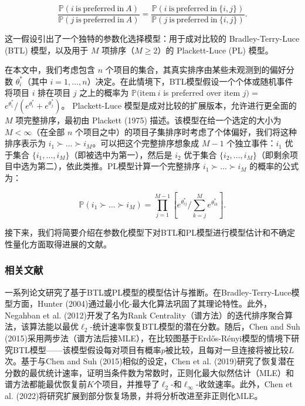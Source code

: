 $$
\frac{\mathbb{P}(i\mathrm{~is~preferred~in~}A)}{\mathbb{P}(j\mathrm{~is~preferred~in~}A)} = \frac{\mathbb{P}(i\mathrm{~is~preferred~in~}\{i,j\})}{\mathbb{P}(j\mathrm{~is~preferred~in~}\{i,j\})}.
$$

这一假设引出了一个独特的参数化选择模型：用于成对比较的 Bradley-Terry-Luce (BTL) 模型，以及用于 $M$ 项排序（$M\geq 2$）的 Plackett-Luce (PL) 模型。

在本文中，我们考虑包含 $n$ 个项目的集合，其真实排序由某些未观测到的偏好分数 $\theta_{i}^{*}$（其中 $i = 1,\dots ,n$）决定。在此情境下，BTL模型假设一个个体或随机事件将项目 $i$ 排在项目 $j$ 之上的概率为 $\mathbb{P}(\mathrm{item}~i$ is preferred over item $j) =$ $e^{\theta_i^*} / (e^{\theta_i^*} + e^{\theta_j^*})$。 Plackett-Luce 模型是成对比较的扩展版本，允许进行更全面的 $M$ 项完整排序，最初由 Plackett (1975) 描述。该模型在给一个选定的大小为 $M< \infty$（在全部 $n$ 个项目之中）的项目子集排序时考虑了个体偏好，我们将这种排序表示为 $i_{1}\succ \dots \succ i_{M}$。可以把这个完整排序想象成 $M - 1$ 个独立事件：$i_{1}$ 优于集合 $\{i_{1},\ldots ,i_{M}\}$（即被选中为第一），然后是 $i_{2}$ 优于集合 $\{i_{2},\ldots ,i_{M}\}$（即剩余项目中选为第二），依此类推。PL模型计算一个完整排序 $i_{1}\succ \dots \succ i_{M}$ 的概率的公式为：

$$
\mathbb{P}(i_1\succ \dots \succ i_M) = \prod_{j = 1}^{M - 1}\left[e^{\theta_{ij}^*} / \sum_{k = j}^{M}e^{\theta_{ik}^*}\right].
$$

接下来，我们将简要介绍在参数化模型下对BTL和PL模型进行模型估计和不确定性量化方面取得进展的文献。

\subsubsection{相关文献}

一系列论文研究了基于BTL或PL模型的模型估计与推断。在Bradley-Terry-Luce模型方面，Hunter (2004)通过最小化-最大化算法巩固了其理论特性。此外，Negahban et al. (2012)开发了名为Rank Centrality（谱方法）的迭代排序聚合算法，该算法能以最优$\ell_2$-统计速率恢复BTL模型的潜在分数。随后，Chen and Suh (2015)采用两步法（谱方法后接MLE），在比较图基于Erdős-Rényi模型的情境下研究BTL模型——该模型假设每对项目有概率$p$被比较，且每对一旦连接将被比较$L$次。基于与Chen and Suh (2015)相似的设定，Chen et al. (2019)研究了恢复潜在分数的最优统计速率，证明当条件数为常数时，正则化最大似然估计（MLE）和谱方法都能最优恢复前$K$个项目，并推导了$\ell_2$-和$\ell_\infty$-收敛速率。此外，Chen et al. (2022)将研究扩展到部分恢复场景，并将分析改进至非正则化MLE。

